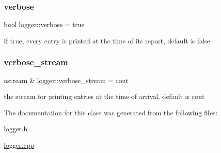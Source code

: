 \subsubsection{\texorpdfstring{verbose}{verbose}}
{\footnotesize\ttfamily bool logger\+::verbose = true\hspace{0.3cm}{\ttfamily [static]}}



if true, every entry is printed at the time of its report, default is false 

\mbox{\label{classlogger_aec58cd6310ffb9939f8509daf1fcfbf8}} 
\subsubsection{\texorpdfstring{verbose\+\_\+stream}{verbose\_stream}}
{\footnotesize\ttfamily ostream \& logger\+::verbose\+\_\+stream = cout\hspace{0.3cm}{\ttfamily [static]}}



the stream for printing entries at the time of arrival, default is cout 



The documentation for this class was generated from the following files\+:\begin{DoxyCompactItemize}
\item 
\hyperlink{logger_8h}{logger.\+h}\item 
\hyperlink{logger_8cpp}{logger.\+cpp}\end{DoxyCompactItemize}
